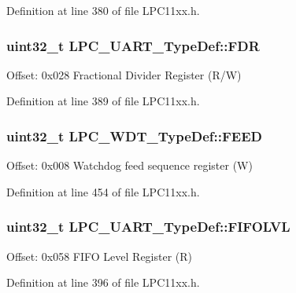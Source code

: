 Definition at line 380 of file L\+P\+C11xx.\+h.

\subsubsection[{\texorpdfstring{F\+DR}{FDR}}]{ uint32\+\_\+t L\+P\+C\+\_\+\+U\+A\+R\+T\+\_\+\+Type\+Def\+::\+F\+DR}\hypertarget{group___l_p_c11xx___definitions_gabd85169bcb084d583ebd1b7bec5c06a8}{}\label{group___l_p_c11xx___definitions_gabd85169bcb084d583ebd1b7bec5c06a8}
Offset\+: 0x028 Fractional Divider Register (R/W) 

Definition at line 389 of file L\+P\+C11xx.\+h.

\subsubsection[{\texorpdfstring{F\+E\+ED}{FEED}}]{ uint32\+\_\+t L\+P\+C\+\_\+\+W\+D\+T\+\_\+\+Type\+Def\+::\+F\+E\+ED}\hypertarget{group___l_p_c11xx___definitions_ga6a47b06c1daa5f07ba8c62127414f5f6}{}\label{group___l_p_c11xx___definitions_ga6a47b06c1daa5f07ba8c62127414f5f6}
Offset\+: 0x008 Watchdog feed sequence register (W) 

Definition at line 454 of file L\+P\+C11xx.\+h.

\subsubsection[{\texorpdfstring{F\+I\+F\+O\+L\+VL}{FIFOLVL}}]{ uint32\+\_\+t L\+P\+C\+\_\+\+U\+A\+R\+T\+\_\+\+Type\+Def\+::\+F\+I\+F\+O\+L\+VL}\hypertarget{group___l_p_c11xx___definitions_ga3a853929f0e5b479297d55f150bf017e}{}\label{group___l_p_c11xx___definitions_ga3a853929f0e5b479297d55f150bf017e}
Offset\+: 0x058 F\+I\+FO Level Register (R) 

Definition at line 396 of file L\+P\+C11xx.\+h.

